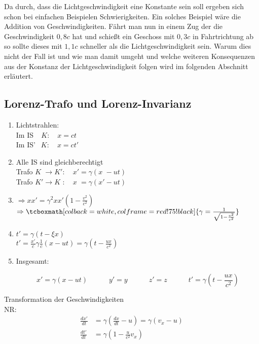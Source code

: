 \documentclass[titlepage,11pt,a4paper,ngerman]{report}
\newcommand{\frbox}[2]{\begin{tcolorbox}[colback=white,colframe=red!75!black,fonttitle=\bfseries,title=#1]#2\end{tcolorbox}}
\newcommand{\rmbox}[1]{\tcboxmath[colback=white,colframe=red!75!black]{#1}}
\begin{document}
Da durch, dass die Lichtgeschwindigkeit eine Konstante sein soll ergeben sich schon bei einfachen Beispielen Schwierigkeiten. Ein solches Beispiel wäre die Addition von Geschwindigkeiten. Fährt man nun in einem Zug der die Geschwindigkeit $ 0{,}8 c $ hat und schießt ein Geschoss mit $ 0{,}3 c $ in Fahrtrichtung ab so sollte dieses mit $ 1{,}1 c $ schneller als die Lichtgeschwindigkeit sein. Warum dies nicht der Fall ist und wie man damit umgeht und welche weiteren Konsequenzen aus der Konstanz der Lichtgeschwindigkeit folgen wird im folgenden Abschnitt erläutert.

\subsection{Lorenz-Trafo und Lorenz-Invarianz}

\begin{enumerate}[1)]
	\item Lichtstrahlen:\\
	Im IS$ \phantom' $ $ \ \ K: \quad x = ct $\\
	Im IS' $ \ \ K: \quad x = ct' $
	\item Alle IS sind gleichberechtigt\\
	Trafo $ K\phantom' \rightarrow K': \quad x' = \gamma (x\phantom' - ut) $\\
	Trafo $ K' \rightarrow K\phantom': \quad x\phantom' = \gamma (x' - ut) $
	\item $ \Rightarrow xx' = \gamma^2 xx' \left(1 - \frac{v^2}{c^2}\right) $\\
	$ \Rightarrow \rmbox{\gamma = \frac{1}{\sqrt{1 - \frac{v^2}{c^2}}}} $
	
	
	\item
	$t' = \gamma (t - \xi x)$\\
	$t' = \frac{x'}{c} \gamma \frac{1}{c} (x - ut) = \gamma (t - \frac{ux}{c^2})$
	\item Insgesamt:
	\frbox{Lorenz-Trafo}{\begin{equation*}
	x' = \gamma (x - ut) \qquad \quad y' = y \qquad \quad z' = z \qquad \quad t' = \gamma \left(t - \frac{ux}{c^2}\right)
	\end{equation*}}
\end{enumerate}
Transformation der Geschwindigkeiten\\
NR:
\begin{align*}
\frac{dx'}{dt} &= \gamma \left(\frac{dx}{dt} - u\right) = \gamma (v_x - u)\\
\frac{dt'}{dt} &= \gamma \left(1 - \frac{u}{c^2} v_x\right)
\end{align*}
\end{document}
